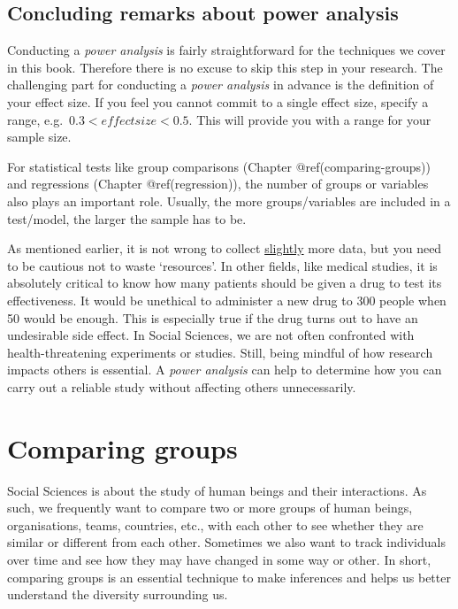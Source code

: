 \documentclass[
  letterpaper,
]{krantz}
\begin{document}
\section{Concluding remarks about power
analysis}\label{concluding-remarks-about-power-analysis}

Conducting a \emph{power analysis} is fairly straightforward for the
techniques we cover in this book. Therefore there is no excuse to skip
this step in your research. The challenging part for conducting a
\emph{power analysis} in advance is the definition of your effect size.
If you feel you cannot commit to a single effect size, specify a range,
e.g.~\(0.3 < effect size < 0.5\). This will provide you with a range for
your sample size.

For statistical tests like group comparisons (Chapter
@ref(comparing-groups)) and regressions (Chapter @ref(regression)), the
number of groups or variables also plays an important role. Usually, the
more groups/variables are included in a test/model, the larger the
sample has to be.

As mentioned earlier, it is not wrong to collect \ul{slightly} more
data, but you need to be cautious not to waste `resources'. In other
fields, like medical studies, it is absolutely critical to know how many
patients should be given a drug to test its effectiveness. It would be
unethical to administer a new drug to 300 people when 50 would be
enough. This is especially true if the drug turns out to have an
undesirable side effect. In Social Sciences, we are not often confronted
with health-threatening experiments or studies. Still, being mindful of
how research impacts others is essential. A \emph{power analysis} can
help to determine how you can carry out a reliable study without
affecting others unnecessarily.


\chapter{Comparing groups}\label{sec-comparing-groups}

Social Sciences is about the study of human beings and their
interactions. As such, we frequently want to compare two or more groups
of human beings, organisations, teams, countries, etc., with each other
to see whether they are similar or different from each other. Sometimes
we also want to track individuals over time and see how they may have
changed in some way or other. In short, comparing groups is an essential
technique to make inferences and helps us better understand the
diversity surrounding us.
\end{document}
